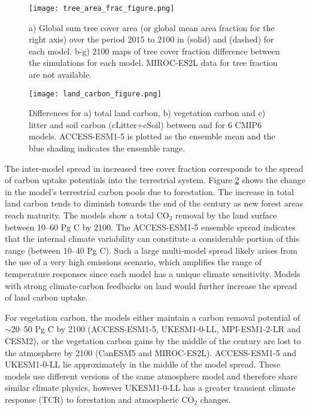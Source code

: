 \documentclass[draft]{agujournal2019}
\begin{document}
\begin{figure}
    \texttt{[image: tree\_area\_frac\_figure.png]}
    \caption{a) Global sum tree cover area (or global mean area fraction for the right axis) over the period 2015 to 2100 in  (solid) and  (dashed) for each model. b-g) 2100 maps of tree cover fraction difference between the simulations for each model. MIROC-ES2L data for tree fraction are not available.}
    \label{fig:land_use_map}
\end{figure}

\begin{figure}
    \texttt{[image: land\_carbon\_figure.png]}
    \caption{Differences for a) total land carbon, b) vegetation carbon and c) litter and soil carbon (cLitter+cSoil) between  and  for 6 CMIP6 models. ACCESS-ESM1-5 is plotted as the ensemble mean and the blue shading indicates the ensemble range. }
    \label{fig:models_cpools}
\end{figure}

The inter-model spread in increased tree cover fraction corresponds to the spread of carbon uptake potentials into the terrestrial system.
Figure \ref{fig:models_cpools} shows the change in the model's terrestrial carbon pools due to forestation.
The increase in total land carbon tends to diminish towards the end of the century as new forest areas reach maturity.
The models show a total CO$_2$ removal by the land surface between 10--60 Pg C by 2100.
The ACCESS-ESM1-5 ensemble spread indicates that the internal climate variability can constitute a considerable portion of this range (between 10--40 Pg C).
Such a large multi-model spread likely arises from the use of a very high emissions scenario, which amplifies the range of temperature responses since each model has a unique climate sensitivity.
Models with strong climate-carbon feedbacks on land would further increase the spread of land carbon uptake.

For vegetation carbon, the models either maintain a carbon removal potential of $\sim$20--50 Pg C by 2100 (ACCESS-ESM1-5, UKESM1-0-LL, MPI-ESM1-2-LR and CESM2), or the vegetation carbon gains by the middle of the century are lost to the atmosphere by 2100 (CanESM5 and MIROC-ES2L).
ACCESS-ESM1-5 and UKESM1-0-LL lie approximately in the middle of the model spread.
These models use different versions of the same atmosphere model and therefore share similar climate physics, however UKESM1-0-LL has a greater transient climate response (TCR) to forestation and atmospheric CO$_2$ changes.
\end{document}
